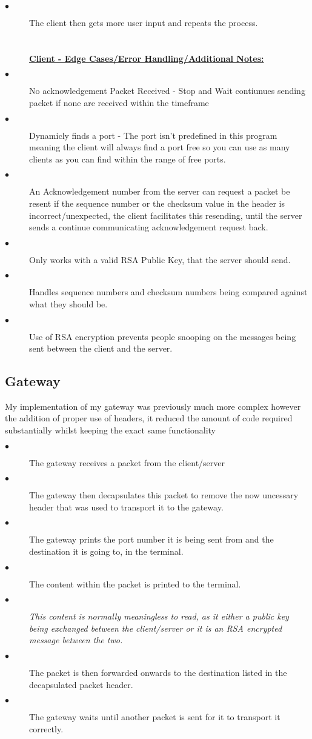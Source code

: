 \documentclass[10pt]{article}
\begin{document}
\begin{description}
	\item[$\bullet$ ] The client then gets more user input and repeats the process.\\\\\\
	\textbf{\underline{Client - Edge Cases/Error Handling/Additional Notes:}} \\
	\item[$\bullet$ ] No acknowledgement Packet Received - Stop and Wait contiunues sending packet if none are received within the timeframe
	\item[$\bullet$ ] Dynamicly finds a port - The port isn't predefined in this program meaning the client will always find a port free so you can use as many clients as you can find within the range of free ports.
	\item[$\bullet$ ] An Acknowledgement number from the server can request a packet be resent if the sequence number or the checksum value in the header is incorrect/unexpected, the client facilitates this resending, until the server sends a continue communicating acknowledgement request back.
	\item[$\bullet$ ] Only works with a valid RSA Public Key, that the server should send.
	\item[$\bullet$ ] Handles sequence numbers and checksum numbers being compared against what they should be.
	\item[$\bullet$ ] Use of RSA encryption prevents people snooping on the messages being sent between the client and the server.\newpage
\end{description}
\subsection{Gateway}
My implementation of my gateway was previously much more complex however the addition of proper use of headers, it reduced the amount of code required substantially whilst keeping the exact same functionality
\begin{description}
\item[$\bullet$ ] The gateway receives a packet from the client/server
\item[$\bullet$ ] The gateway then decapsulates this packet to remove the now uncessary header that was used to transport it to the gateway.
\item[$\bullet$ ] The gateway prints the port number it is being sent from and the destination it is going to, in the terminal.
\item[$\bullet$ ] The content within the packet is printed to the terminal.
\item[$\bullet$ ] \textit{This content is normally meaningless to read, as it either a public key being exchanged between the client/server or it is an RSA encrypted message between the two.}
\item[$\bullet$ ] The packet is then forwarded onwards to the destination listed in the decapsulated  packet header.
\item[$\bullet$ ] The gateway waits until another packet is sent for it to transport it correctly.
\end{description}
\end{document}
